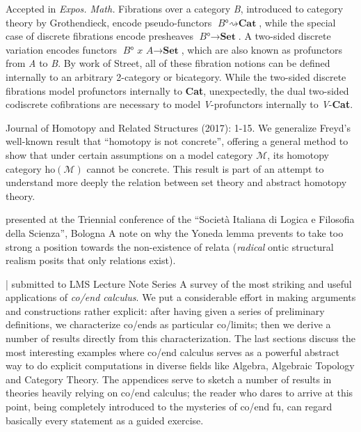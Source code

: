 \begin{eyenumerate}
   \item {}
   {Accepted in \emph{Expos. Math.}}
   {Fibrations over a category \textit{B}, introduced to category theory by Grothendieck, encode pseudo-functors $\textit{B°} \rightsquigarrow {\textbf{Cat}}$, while the special case of discrete fibrations encode presheaves $\textit{B°} \to \textbf{Set}$. A two-sided discrete variation encodes functors $\textit{B° x A} \to \textbf{Set}$, which are also known as profunctors from \textit{A} to \textit{B}. By work of Street, all of these fibration notions can be defined internally to an arbitrary 2-category or bicategory. While the two-sided discrete fibrations model profunctors internally to \textbf{Cat}, unexpectedly, the dual two-sided codiscrete cofibrations are necessary to model \textit{V}-profunctors internally to \textit{V}-\textbf{Cat}.}
   \item {}
   {Journal of Homotopy and Related Structures (2017): 1-15.}
   {We generalize Freyd's well-known result that ``homotopy is not concrete'', offering a general method to show that under certain assumptions on a model category $\mathcal M$, its homotopy category $\text{ho}(\mathcal M)$ cannot be concrete. This result is part of an attempt to understand more deeply the relation between set theory and abstract homotopy theory.}
   \item {}
   {presented at the Triennial conference of the “Società Italiana di Logica e Filosofia della Scienza”, Bologna}
   {A note on why the Yoneda lemma prevents to take too strong a position towards the non-existence of relata (\emph{radical} ontic structural realism posits that only relations exist).}
   \item {}
   { | submitted to LMS Lecture Note Series}
   {A survey of the most striking and useful applications of \emph{co/end calculus}. We put a considerable effort in making arguments and constructions rather explicit: after having given a series of preliminary definitions, we characterize co/ends as particular co/limits; then we derive a number of results directly from this characterization. The last sections discuss the most interesting examples where co/end calculus serves as a powerful abstract way to do explicit computations in diverse fields like Algebra, Algebraic Topology and Category Theory. The appendices serve to sketch a number of results in theories heavily relying on co/end calculus; the reader who dares to arrive at this point, being completely introduced to the mysteries of co/end fu, can regard basically every statement as a guided exercise.}

\end{eyenumerate}
